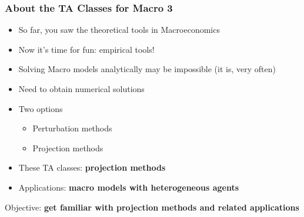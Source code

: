 \documentclass[10pt, aspectratio=1610, handout]{beamer}
\begin{document}
  \begin{frame}
    \frametitle{About the TA Classes for Macro 3}

    \begin{itemize}
      \item So far, you saw the theoretical tools in Macroeconomics
      \item Now it's time for fun: empirical tools!
    \end{itemize}

    \vfill\pause

    \begin{itemize}
      \item Solving Macro models analytically may be impossible (it is, very often)
      \item Need to obtain numerical solutions
      \item Two options
        \begin{itemize}
          \item Perturbation methods
          \item Projection methods
        \end{itemize}
    \end{itemize}

    \vfill\pause

    \begin{itemize}
      \item These TA classes: \textbf{projection methods}
      \item Applications: \textbf{macro models with heterogeneous agents}
    \end{itemize}

    \vfill\pause

    Objective: \textbf{get familiar with projection methods and related applications}

  \end{frame}
\end{document}
